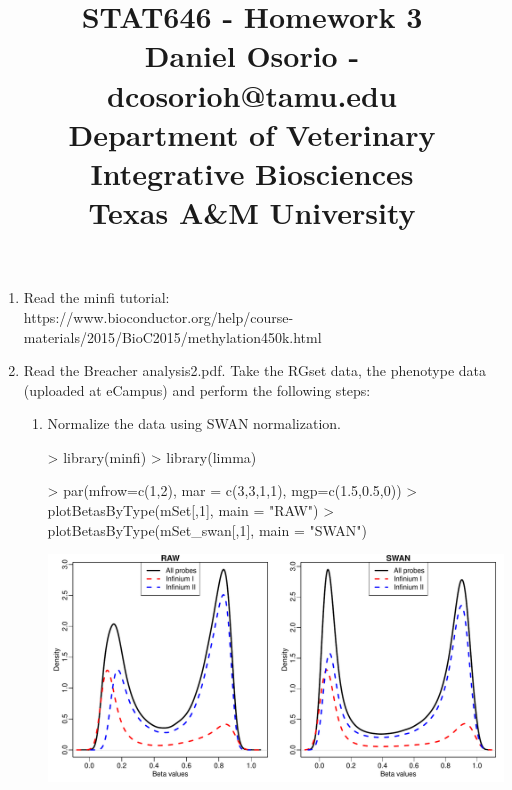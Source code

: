 \documentclass[12pt,a4paper]{paper}
\begin{document}
\title{STAT646 - Homework 3\\\small{Daniel Osorio - dcosorioh@tamu.edu\\Department of Veterinary Integrative Biosciences\\Texas A\&M University}}
\maketitle

\begin{enumerate}
\item Read the minfi tutorial: \\https://www.bioconductor.org/help/course-materials/2015/BioC2015/methylation450k.html
\item Read the Breacher analysis2.pdf. Take the RGset data, the phenotype data (uploaded at eCampus) and perform the following steps:
\begin{enumerate}
\item Normalize the data using SWAN normalization.
\begin{Schunk}
\begin{Sinput}
> library(minfi)
> library(limma)
\end{Sinput}
\end{Schunk}
\begin{Schunk}
\end{Schunk}
\begin{Schunk}
\begin{Sinput}
> par(mfrow=c(1,2), mar = c(3,3,1,1), mgp=c(1.5,0.5,0))
> plotBetasByType(mSet[,1], main = "RAW")
> plotBetasByType(mSet_swan[,1], main = "SWAN")
\end{Sinput}
\end{Schunk}
\includegraphics{Osorio_Daniel_HW3-003}

\end{enumerate}
\end{enumerate}
\end{document}
